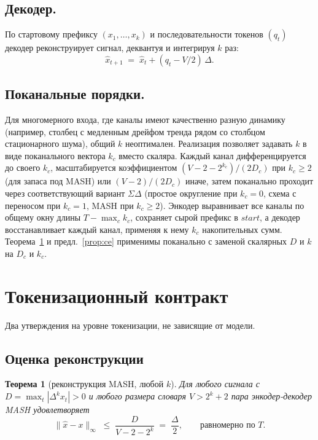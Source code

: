 \documentclass[11pt]{article}
\newtheorem{theorem}{Теорема}
\theoremstyle{remark}
\begin{document}
\subsection{Декодер.}
По стартовому префиксу $(x_1, \ldots, x_k)$ и последовательности
токенов $(q_t)$ декодер реконструирует сигнал, деквантуя и интегрируя
$k$ раз:
\begin{equation}
\hat x_{t+1} \;=\; \hat x_t + (q_t - V/2)\,\Delta.
\end{equation}

\subsection{Поканальные порядки.}
Для многомерного входа, где каналы имеют качественно разную динамику
(например, столбец с медленным дрейфом тренда рядом со столбцом
стационарного шума), общий $k$ неоптимален. Реализация позволяет
задавать $k$ в виде поканального вектора $k_c$ вместо скаляра. Каждый
канал дифференцируется до своего $k_c$, масштабируется коэффициентом
$(V - 2 - 2^{k_c}) / (2 D_c)$ при $k_c \ge 2$ (для запаса под MASH)
или $(V - 2) / (2 D_c)$ иначе, затем поканально проходит через
соответствующий вариант $\Sigma\Delta$ (простое округление при
$k_c = 0$, схема с переносом при $k_c = 1$, MASH при $k_c \ge 2$).
Энкодер выравнивает все каналы по общему окну длины $T - \max_c k_c$,
сохраняет сырой префикс в $start$, а декодер восстанавливает каждый
канал, применяя к нему $k_c$ накопительных сумм. Теорема~\ref{thm:recon}
и предл.~\ref{prop:ce} применимы поканально с заменой скалярных $D$ и
$k$ на $D_c$ и $k_c$.

\section{Токенизационный контракт}
\label{sec:theory}

Два утверждения на уровне токенизации, не зависящие от модели.

\subsection{Оценка реконструкции}

\begin{theorem}[реконструкция MASH, любой $k$]
\label{thm:recon}
Для любого сигнала с $D = \max_t |\Delta^k x_t| > 0$ и любого размера
словаря $V > 2^k + 2$ пара энкодер-декодер MASH удовлетворяет
\begin{equation}
\|\hat x - x\|_\infty \;\le\; \frac{D}{V - 2 - 2^k} \;=\; \frac{\Delta}{2},
\qquad \text{равномерно по } T.
\end{equation}
\end{theorem}
\end{document}
